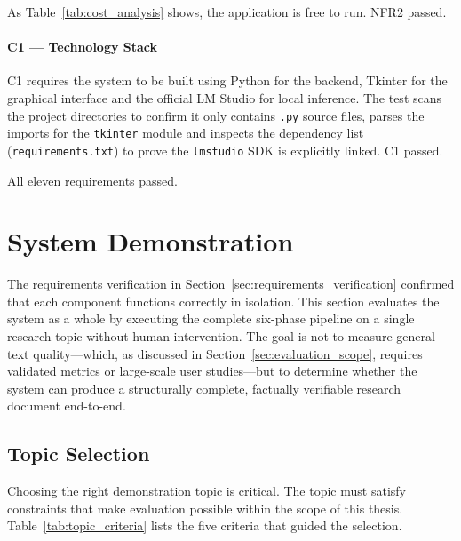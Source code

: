 As Table~\ref{tab:cost_analysis} shows, the application is free to run.
NFR2 passed.

\paragraph{C1 — Technology Stack}
C1 requires the system to be built using Python for the backend, Tkinter for the graphical interface and the official LM Studio for local inference.
The test scans the project directories to confirm it only contains \texttt{.py} source files, parses the imports for the \texttt{tkinter} module and inspects the dependency list (\texttt{requirements.txt}) to prove the \texttt{lmstudio} SDK is explicitly linked.
C1 passed.

All eleven requirements passed.

\section{System Demonstration}
\label{sec:system_demonstration}

The requirements verification in Section~\ref{sec:requirements_verification} confirmed that each
component functions correctly in isolation.
This section evaluates the system as a whole by executing
the complete six-phase pipeline on a single research topic without human intervention.
The goal is not to measure general text quality---which, as discussed in Section~\ref{sec:evaluation_scope}, requires validated metrics
or large-scale user studies---but to determine whether the system can produce a structurally complete,
factually verifiable research document end-to-end.

\subsection{Topic Selection}

Choosing the right demonstration topic is critical.
The topic must satisfy constraints that make evaluation possible within the scope of this thesis.
Table~\ref{tab:topic_criteria} lists the five criteria that guided the selection.

